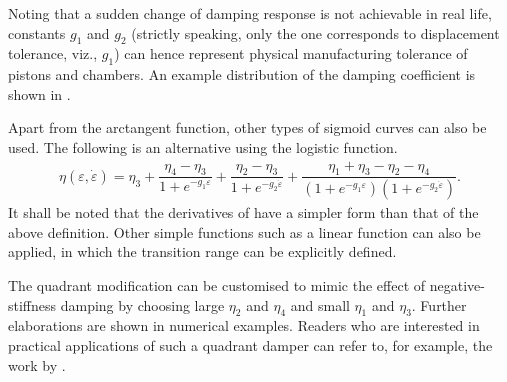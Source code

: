 Noting that a sudden change of damping response is not achievable in real life, constants $g_1$ and $g_2$ (strictly speaking, only the one corresponds to displacement tolerance, viz., $g_1$) can hence represent physical manufacturing tolerance of pistons and chambers. An example distribution of the damping coefficient is shown in .

Apart from the arctangent function, other types of sigmoid curves can also be used. The following is an alternative using the logistic function.
\begin{gather}
\eta\left(\varepsilon,\dot\varepsilon\right)=\eta_3+\dfrac{\eta_4-\eta_3}{1+e^{-g_1\varepsilon}}+\dfrac{\eta_2-\eta_3}{1+e^{-g_2\dot{\varepsilon}}}+\dfrac{\eta_1+\eta_3-\eta_2-\eta_4}{\left(1+e^{-g_1\varepsilon}\right)\left(1+e^{-g_2\dot{\varepsilon}}\right)}.
\end{gather}
It shall be noted that the derivatives of  have a simpler form than that of the above definition. Other simple functions such as a linear function can also be applied, in which the transition range can be explicitly defined.

The quadrant modification can be customised to mimic the effect of negative-stiffness damping \citep[see][]{Iemura2009,Hoegsberg2011,Zhou2015,Javanbakht2018} by choosing large $\eta_2$ and $\eta_4$ and small $\eta_1$ and $\eta_3$. Further elaborations are shown in numerical examples. Readers who are interested in practical applications of such a quadrant damper can refer to, for example, the work by \citet{Hazaveh2017}.
